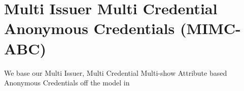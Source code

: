 % 
% 



































% 
% 




\cleardoublepage
\section{Multi Issuer Multi Credential Anonymous Credentials (MIMC-ABC)}\label{sec:mimc}

We base our Multi Issuer, Multi Credential Multi-show Attribute based Anonymous Credentials off the model in \cite{fuchsbauer_structure-preserving_2019}


